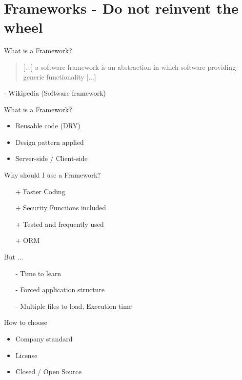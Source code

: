 \section{Frameworks - Do not reinvent the wheel}
\begin{frame}{What is a Framework?}
	\begin{quote}
		[...] a software framework is an abstraction in which software providing generic functionality [...]
	\end{quote}
	- Wikipedia (Software framework)
\end{frame}

\begin{frame}{What is a Framework?}
	\begin{itemize}
		\item Reusable code (DRY)
		\item Design pattern applied
		\item Server-side / Client-side %
	\end{itemize}
\end{frame}

\begin{frame}{Why should I use a Framework?}
	\begin{itemize}
		\item[+] Faster Coding
		\item[+] Security Functions included
		\item[+] Tested and frequently used
		\item[+] ORM
	\end{itemize}
\end{frame}

\begin{frame}{But ...}
	\begin{itemize}
		\item[-] Time to learn
		\item[-] Forced application structure
		\item[-] Multiple files to load, Execution time
	\end{itemize}
\end{frame}

\begin{frame}{How to choose}
	\begin{itemize}
		\item Company standard
		\item License
		\item Closed / Open Source
	\end{itemize}
\end{frame}


